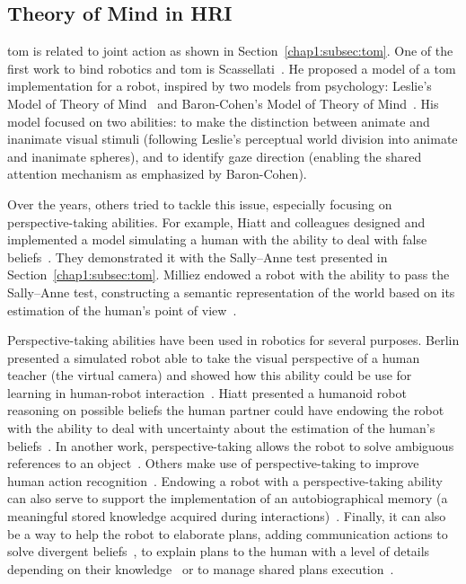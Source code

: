 \documentclass[a4paper,11pt,twoside]{StyleThese}
\begin{document}
\subsection{Theory of Mind in HRI}\label{chap1:subsec:tom_hri}
\acrfull{tom} is related to joint action as shown in Section~\ref{chap1:subsec:tom}. One of the first work to bind robotics and \acrshort{tom} is Scassellati~\cite{scassellati_2002_theory}. He proposed a model of a \acrshort{tom} implementation for a robot, inspired by two models from psychology: Leslie’s Model of Theory of Mind~\cite{leslie_1984_spatiotemporal} and Baron-Cohen’s Model of Theory of Mind~\cite{baron-cohen_1995_mindblindness}. His model focused on two abilities: to make the distinction between animate and inanimate visual stimuli (following Leslie's perceptual world division into animate and inanimate spheres), and to identify gaze direction (enabling the shared attention mechanism as emphasized by Baron-Cohen). 

Over the years, others tried to tackle this issue, especially focusing on perspective-taking abilities. For example, Hiatt and colleagues designed and implemented a model simulating a human with the ability to deal with false beliefs~\cite{hiatt_2010_cognitive}. They demonstrated it with the Sally--Anne test presented in Section~\ref{chap1:subsec:tom}. Milliez \etal{} endowed a robot with the ability to pass the Sally--Anne test, constructing a semantic representation of the world based on its estimation of the human's point of view~\cite{milliez_2014_framework}.

Perspective-taking abilities have been used in robotics for several purposes. Berlin \etal{} presented a simulated robot able to take the visual perspective of a human teacher (the virtual camera) and showed how this ability could be use for learning in human-robot interaction~\cite{berlin_2006_perspective}. Hiatt \etal{} presented a humanoid robot reasoning on possible beliefs the human partner could have endowing the robot with the ability to deal with uncertainty about the estimation of the human's beliefs~\cite{hiatt_2011_accommodating}. In another work, perspective-taking allows the robot to solve ambiguous references to an object~\cite{ros_2010_solving}. Others make use of perspective-taking to improve human action recognition~\cite{johnson_2005_perceptual}. Endowing a robot with a perspective-taking ability can also serve to support the implementation of an autobiographical memory (a meaningful stored knowledge acquired during interactions)~\cite{pointeau_2017_role}. Finally, it can also be a way to help the robot to elaborate plans, adding communication actions to solve divergent beliefs~\cite{warnier_2012_robot}, to explain plans to the human with a level of details depending on their knowledge~\cite{milliez_2016_using} or to manage shared plans execution~\cite{devin_2016_implemented}.
\end{document}
